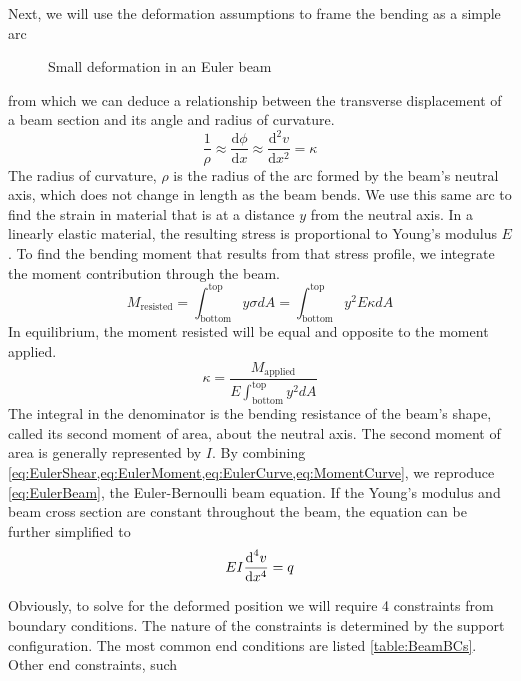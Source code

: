 Next, we will use the deformation assumptions to frame the bending as a simple arc
%
\begin{figure}[htbp]
  \centering
  
  \caption{Small deformation in an Euler beam}
  \label{fig:EulerBeam1}
\end{figure}
%
from which we can deduce a relationship between the transverse displacement of a beam section and its angle and radius of curvature. 
\begin{equation}
 \label{eq:EulerCurve}
 \frac{1}{\rho} \approx \frac{\text{d} \phi}{\text{d} x} \approx \frac{\text{d}^2v}{\text{d}x^2} = \kappa
\end{equation}
The radius of curvature, $\rho$ is the radius of the arc formed by the beam's neutral axis, which does not change in length as the beam bends.
We use this same arc to find the strain in material that is at a distance $y$ from the neutral axis.
In a linearly elastic material, the resulting stress is proportional to Young's modulus $E$.
To find the bending moment that results from that stress profile, we integrate the moment contribution through the beam.
\begin{equation}
M_\text{resisted} = \int_\text{bottom}^\text{top}y\sigma dA = \int_\text{bottom}^\text{top}y^2 E \kappa dA
\end{equation}
In equilibrium, the moment resisted will be equal and opposite to the moment applied.
\begin{equation}
\label{eq:MomentCurve}
\kappa = \frac{M_\text{applied}}{E \int_\text{bottom}^\text{top}y^2dA}
\end{equation}
The integral in the denominator is the bending resistance of the beam's shape, called its second moment of area, about the neutral axis.
The second moment of area is generally represented by $I$.
By combining \cref{eq:EulerShear,eq:EulerMoment,eq:EulerCurve,eq:MomentCurve}, we reproduce  \cref{eq:EulerBeam}, the Euler-Bernoulli beam equation.
If the Young's modulus and beam cross section are constant throughout the beam, the equation can be further simplified to
\begin{equation}
EI\frac{\text{d}^4 v}{\text{d}x^4}=q\notag
\end{equation}

Obviously, to solve for the deformed position we will require 4 constraints from boundary conditions.
The nature of the constraints is determined by the support configuration.
The most common end conditions are listed \cref{table:BeamBCs}.
Other end constraints, such 

